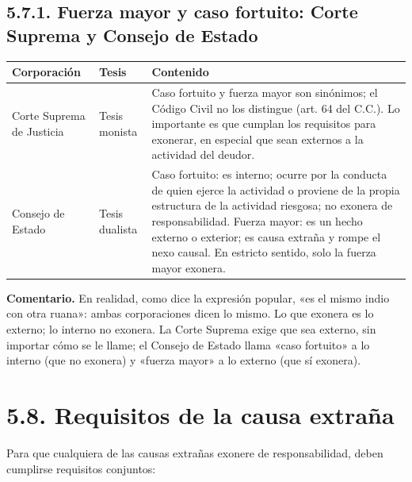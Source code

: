 \subsection{5.7.1. Fuerza mayor y caso fortuito: Corte Suprema y Consejo de Estado}
\begin{tabla}
\begin{longtable}{|>{\raggedright\arraybackslash}m{}|>{\raggedright\arraybackslash}m{}|>{\raggedright\arraybackslash}m{}|}
\hline
\cellcolor[HTML]{1F3864}\textcolor[HTML]{FFFFFF}{\textbf{Corporación}} & \cellcolor[HTML]{1F3864}\textcolor[HTML]{FFFFFF}{\textbf{Tesis}} & \cellcolor[HTML]{1F3864}\textcolor[HTML]{FFFFFF}{\textbf{Contenido}} \\ \hline
Corte Suprema de Justicia & Tesis monista & Caso fortuito y fuerza mayor son sinónimos; el Código Civil no los distingue (art. 64 del C.C.). Lo importante es que cumplan los requisitos para exonerar, en especial que sean externos a la actividad del deudor. \\ \hline
\cellcolor[HTML]{F2F5FA}Consejo de Estado & \cellcolor[HTML]{F2F5FA}Tesis dualista & \cellcolor[HTML]{F2F5FA}Caso fortuito: es interno; ocurre por la conducta de quien ejerce la actividad o proviene de la propia estructura de la actividad riesgosa; no exonera de responsabilidad. Fuerza mayor: es un hecho externo o exterior; es causa extraña y rompe el nexo causal. En estricto sentido, solo la fuerza mayor exonera. \\ \hline
\end{longtable}
\end{tabla}
\begin{comentario}
\textcolor[HTML]{8A6D3B}{\textbf{Comentario. }}En realidad, como dice la expresión popular, «es el mismo indio con otra ruana»: ambas corporaciones dicen lo mismo. Lo que exonera es lo externo; lo interno no exonera. La Corte Suprema exige que sea externo, sin importar cómo se le llame; el Consejo de Estado llama «caso fortuito» a lo interno (que no exonera) y «fuerza mayor» a lo externo (que sí exonera).
\end{comentario}
\section{5.8. Requisitos de la causa extraña}
Para que cualquiera de las causas extrañas exonere de responsabilidad, deben cumplirse requisitos conjuntos:

